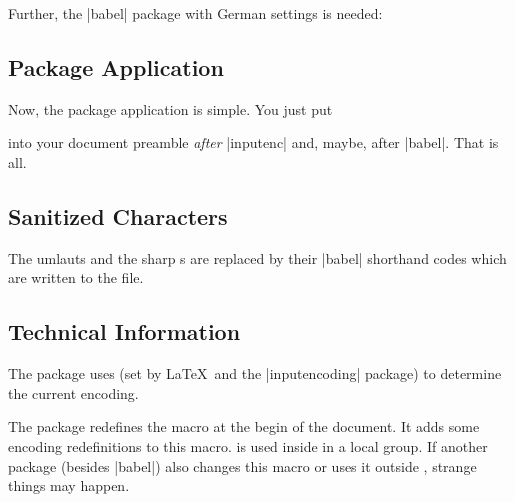 \documentclass[a4paper,11pt]{ltxdoc}
\begin{document}
Further, the |babel| package with German settings is needed:

\begin{dispListing}
\usepackage[ngerman]{babel}
\end{dispListing}

\subsection{Package Application}
Now, the package application is simple. You just put

\begin{dispListing}
\usepackage{sanitize-umlaut}
\end{dispListing}

into your document preamble \emph{after} |inputenc| and, maybe, after |babel|.
That is all.


\subsection{Sanitized Characters}

The umlauts and the sharp s are replaced by their |babel| shorthand codes
which are written to the  file.



\subsection{Technical Information}

The package uses  (set by \LaTeX\ and the |inputencoding| package)
to determine the current encoding.

The package redefines the \myverb{\@sanitize} macro at the begin of the
document. It adds some encoding redefinitions to this macro.
\myverb{\@sanitize} is used inside \myverb{\index} in a local group.
If another package (besides |babel|) also changes this macro or uses it
outside \myverb{\index}, strange things may happen.
\end{document}
